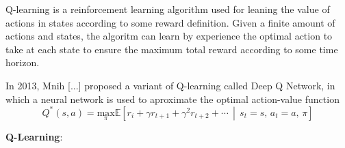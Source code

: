 Q-learning is a reinforcement learning algorithm used for leaning the value of actions in states according to some reward definition. Given a finite amount of actions and states, the algoritm can learn by experience the optimal action to take at each state to ensure the maximum total reward according to some time horizon.

In 2013, Mnih [...] proposed a variant of Q-learning called Deep Q Network, in which a neural network is used to aproximate the optimal action-value function
\begin{equation}
    Q^*(s,a)=\underset \pi {\text{max}} \mathbb{E}\left[ r_i+\gamma r_{t+1}+\gamma^2 r_{t+2}+\cdots \,\middle|\, s_t=s,\,a_t=a,\,\pi \right]
\end{equation}



\textbf{Q-Learning}: